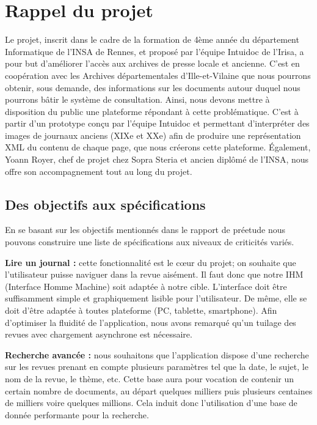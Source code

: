 \section{Rappel du projet}
\label{sec:rapp}

Le projet, inscrit dans le cadre de la formation de 4ème année du département Informatique de l’INSA de Rennes, et proposé par l’équipe
Intuidoc de l’Irisa, a pour but d’améliorer l’accès aux archives de presse locale et ancienne. C’est en coopération avec les Archives
départementales d’Ille-et-Vilaine que nous pourrons obtenir, sous demande, des informations sur les documents autour duquel nous pourrons bâtir le système de consultation.
Ainsi, nous devons mettre à disposition du public une plateforme répondant à cette problématique.
C’est à partir d’un prototype conçu par l’équipe Intuidoc et permettant d’interpréter des images de journaux anciens (XIXe et XXe) afin
de produire une représentation XML du contenu de chaque page, que nous créerons cette plateforme.
Également, Yoann Royer, chef de projet chez Sopra Steria et ancien diplômé de l’INSA, nous offre son accompagnement tout au long du projet.

    \subsection{Des objectifs aux spécifications}
    \label{sec:objectifs}
    En se basant sur les objectifs mentionnés dans le rapport de préetude nous pouvons construire une liste de spécifications aux niveaux de criticités variés.


    \textbf{Lire un journal :} cette fonctionnalité est le cœur du projet; on souhaite que l’utilisateur puisse naviguer dans la revue aisément.
    Il faut donc que notre IHM (Interface Homme Machine) soit adaptée à notre cible. L’interface doit être suffisamment simple et graphiquement lisible pour l’utilisateur. De même, elle se doit d’être adaptée à toutes plateforme (PC, tablette, smartphone). Afin d’optimiser la fluidité de l’application, nous avons remarqué
    qu’un tuilage des revues avec chargement asynchrone est nécessaire.


    \textbf{Recherche avancée :} nous souhaitons que l’application dispose d’une recherche sur les revues prenant en compte plusieurs paramètres
    tel que la date, le sujet, le nom de la revue, le thème, etc. Cette base aura pour vocation de contenir un certain nombre de documents, au
    départ quelques milliers puis plusieurs centaines de milliers voire quelques millions. Cela induit donc l’utilisation d’une base de donnée
    performante pour la recherche.

